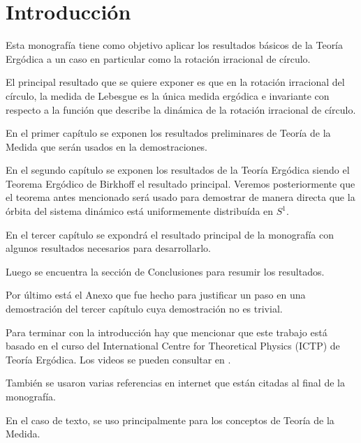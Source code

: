 \chapter*{Introducción}

Esta monografía tiene como objetivo aplicar los resultados básicos de la Teoría Ergódica a un caso en particular como la rotación irracional de círculo.

El principal resultado que se quiere exponer es que en la rotación irracional del círculo, la medida de Lebesgue es la única medida ergódica e invariante con respecto a la función que describe la dinámica de la rotación irracional de círculo.

En el primer capítulo se exponen los resultados preliminares de Teoría de la Medida que serán usados en la demostraciones.

En el segundo capítulo se exponen los resultados de la Teoría Ergódica siendo el Teorema Ergódico de Birkhoff el resultado principal. Veremos posteriormente que el teorema antes mencionado será usado para demostrar de manera directa que la órbita del sistema dinámico está uniformemente distribuída en $S^1$.

En el tercer capítulo se expondrá el resultado principal de la monografía con algunos resultados necesarios para desarrollarlo.

Luego se encuentra la sección de Conclusiones para resumir los resultados.

Por último está el Anexo que fue hecho para justificar un paso en una demostración del tercer capítulo cuya demostración no es trivial.

Para terminar con la introducción hay que mencionar que este trabajo está basado en el curso del International Centre for Theoretical Physics (ICTP) de Teoría Ergódica. Los videos se pueden consultar en \cite{youtube}.

También se usaron varias referencias en internet que están citadas al final de la monografía.

En el caso de texto, se uso principalmente \cite{bartle} para los conceptos de Teoría de la Medida.